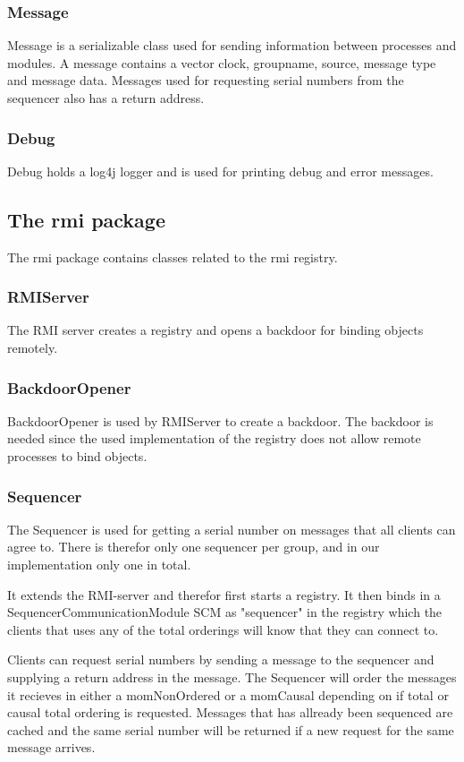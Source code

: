 \documentclass[english]{article}
\begin{document}
\subsubsection{Message}
Message is a serializable class used for sending information between processes and modules. A message contains a vector clock, groupname, source, message type and message data. Messages used for requesting serial numbers from the sequencer also has a return address.

\subsubsection{Debug}
Debug holds a log4j logger and is used for printing debug and error messages.

\subsection{The rmi package}
The rmi package contains classes related to the rmi registry. 

\subsubsection{RMIServer}
The RMI server creates a registry and opens a backdoor for binding objects remotely.

\subsubsection{BackdoorOpener}
BackdoorOpener is used by RMIServer to create a backdoor. The backdoor is needed since the used implementation of the registry does not allow remote processes to bind objects.

\subsubsection{Sequencer}
The Sequencer is used for getting a serial number on messages that all clients can agree to. There is therefor only one sequencer per group, and in our implementation only one in total.

It extends the RMI-server and therefor first starts a registry. It then binds in a SequencerCommunicationModule SCM as "sequencer" in the registry which the clients that uses any of the total orderings will know that they can connect to. 

Clients can request serial numbers by sending a message to the sequencer and supplying a return address in the message. The Sequencer will order the messages it recieves in either a momNonOrdered or a momCausal depending on if total or causal total ordering is requested. Messages that has allready been sequenced are cached and the same serial number will be returned if a new request for the same message arrives.
\end{document}
